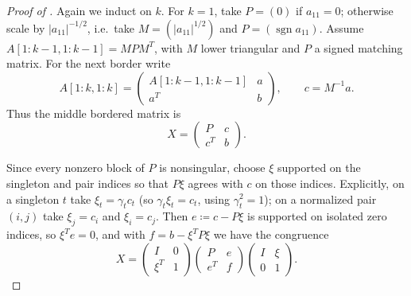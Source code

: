 \documentclass[preprint,12pt]{elsarticle}
\theoremstyle{plain}
\theoremstyle{nonumberplain}
\newtheorem{proof}{Proof}
\numberwithin{equation}{section}
\DeclareMathOperator{\sgn}{sgn}
\numberwithin{theorem}{section}
\begin{document}
\begin{proof}[Proof of ]
  Again we induct on $k$.  For $k=1$, take $P=(0)$ if $a_{11}=0$; otherwise
  scale by $|a_{11}|^{-1/2}$, i.e.\ take $M=(|a_{11}|^{1/2})$ and
  $P=(\sgn a_{11})$.  Assume
  $A[1:k-1,1:k-1]=MPM^T$, with $M$ lower triangular and $P$ a signed
  matching matrix.  For the next border write
  \[
    A[1:k,1:k]=
    \begin{pmatrix}
      A[1:k-1,1:k-1] & a\\
      a^T & b
    \end{pmatrix},
    \qquad c=M^{-1}a .
  \]
  Thus the middle bordered matrix is
  \[
    X=
    \begin{pmatrix}
      P & c\\
      c^T & b
    \end{pmatrix}.
  \]

  Since every nonzero block of $P$ is nonsingular, choose $\xi$ supported on
  the singleton and pair indices so that $P\xi$ agrees with $c$ on those
  indices.  Explicitly, on a singleton $t$ take $\xi_t=\gamma_t c_t$ (so
  $\gamma_t\xi_t=c_t$, using $\gamma_t^2=1$); on a
  normalized pair $(i,j)$ take $\xi_j=c_i$ and $\xi_i=c_j$.  Then
  $e\coloneq c-P\xi$ is supported on isolated zero indices, so $\xi^Te=0$, and with
  $f=b-\xi^TP\xi$ we have the congruence
  \[
    X=
    \begin{pmatrix}I&0\\ \xi^T&1
    \end{pmatrix}
    \begin{pmatrix}P&e\\ e^T&f
    \end{pmatrix}
    \begin{pmatrix}I&\xi\\0&1
    \end{pmatrix}.
  \]


\end{proof}
\end{document}
